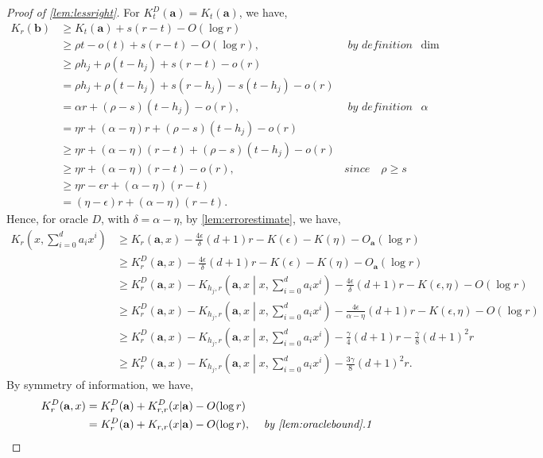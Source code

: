 \documentclass[a4paper,UKenglish,cleveref,autoref,thm-restate]{lipics-v2021}
\renewcommand{\dim}{{\mathrm{dim}}}
\begin{document}
\begin{proof}[Proof of \cref{lem:lessright}]
	For $K_t^D(\mathbf{a})=K_t(\mathbf{a})$, we have, 
	\begin{align*}
		K_r(\mathbf{b})&\geq K_t(\mathbf{a})+s(r-t)-O(\log r)\\
		&\geq\rho t-o(t)+s(r-t)-O(\log r),&\textit{ by definition of $\dim$}\\
		&\geq\rho h_j+\rho(t-h_j)+s(r-t)-o(r)\\
		&=\rho h_j+\rho(t-h_j)+s(r-h_j)-s(t-h_j)-o(r)\\
		&=\alpha r+(\rho-s)(t-h_j)-o(r),&\textit{ by definition of $\alpha$}\\
		&=\eta r+(\alpha-\eta)r+(\rho-s)(t-h_j)-o(r)\\
		&\geq\eta r+(\alpha-\eta)(r-t)+(\rho-s)(t-h_j)-o(r)\\
		&\geq\eta r+(\alpha-\eta)(r-t)-o(r),&\textit{since }\textit{ $\rho\geq s$}\\
		&\geq\eta r-\epsilon r+(\alpha-\eta)(r-t)\\
		&=(\eta-\epsilon)r+(\alpha-\eta)(r-t).
	\end{align*}
	Hence, for oracle $D$, with $\delta=\alpha-\eta$, by \cref{lem:errorestimate}, we have, 
	\begin{align*}
		K_r\left(x,\sum_{i=0}^{d}a_ix^i\right)&\geq K_r(\mathbf{a},x)-\frac{4\epsilon}{\delta}(d+1)r-K(\epsilon)-K(\eta)-O_\mathbf{a}(\log r)\\
		&\geq K_r^D(\mathbf{a},x)-\frac{4\epsilon}{\delta}(d+1)r-K(\epsilon)-K(\eta)-O_\mathbf{a}(\log r)\\
		&\geq K_r^D(\mathbf{a},x)-K_{h_j,r}\left(\mathbf{a},x\middle|x,\sum_{i=0}^{d}a_ix^i\right)-\frac{4\epsilon}{\delta}(d+1)r-K(\epsilon,\eta)-O(\log r)\\
		&\geq K_r^D(\mathbf{a},x)-K_{h_j,r}\left(\mathbf{a},x\middle|x,\sum_{i=0}^{d}a_ix^i\right)-\frac{4\epsilon}{\alpha-\eta}(d+1)r-K(\epsilon,\eta)-O(\log r)\\
		&\geq K_r^D(\mathbf{a},x)-K_{h_j,r}\left(\mathbf{a},x\middle|x,\sum_{i=0}^{d}a_ix^i\right)-\frac{\gamma}{4}(d+1)r-\frac{\gamma}{8}(d+1)^2r\\
		&\geq K_r^D(\mathbf{a},x)-K_{h_j,r}\left(\mathbf{a},x\middle|x,\sum_{i=0}^{d}a_ix^i\right)-\frac{3\gamma}{8}(d+1)^2r.	\end{align*}
	By symmetry of information, we have, 
	\begin{align*}
		K_r^D(\mathbf{a},x)&=K_r^D(\mathbf{a})+K_{r,r}^D(x|\mathbf{a})-O(\log r)\\
		&=K_r^D(\mathbf{a})+K_{r,r}(x|\mathbf{a})-O(\log r),&\textit{ by \cref{lem:oraclebound}.1}\\

\end{align*}
\end{proof}
\end{document}
